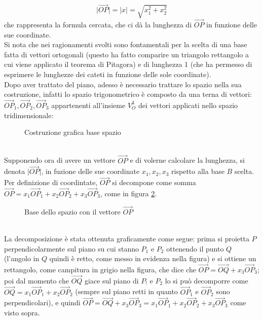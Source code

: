 \documentclass{book}
\newcommand{\abs}[1]{\lvert#1\rvert}
\theoremstyle{definition}
\theoremstyle{plain}
\begin{document}
\begin{equation}
  \label{eq:teoremadiPitapplicatoaAbsOP}
  \abs{\vec{OP}}=\abs{x}=\sqrt{x_1^2+x_2^2}
\end{equation}
che rappresenta la formula cercata, che ci dà la lunghezza di $\vec{OP}$ in funzione delle sue coordinate.\\
Si nota che nei ragionamenti svolti sono fontamentali per la scelta di una base fatta di vettori ortogonali (questo ha fatto comparire un triangolo rettangolo a cui viene applicato il teorema di Pitagora) e di lunghezza 1 (che ha permesso di esprimere le lunghezze dei cateti in funzione delle sole coordinate). \\
Dopo aver trattato del piano, adesso è necessario trattare lo spazio nella sua costruzione, infatti lo spazio trigonometrico è composto da una terna di vettori: $\vec{OP}_1,\vec{OP}_2,\vec{OP}_3$ appartenenti all'insieme $V_O^3$ dei vettori applicati nello spazio tridimensionale:
\begin{figure}[ht!]
  \centering
    \resizebox{4cm}{!}{
      
    }
  \caption{Costruzione grafica base spazio}
  \label{fig:costbasespazio}
\end{figure}\\
Supponendo ora di avere un vettore $\vec{OP}$ e di volerne calcolare la lunghezza, si denota $\abs{\vec{OP}}$, in fuzione delle sue coordinate $x_1,x_2,x_3$ rispetto alla base $B$ scelta. Per definizione di coordintate, $\vec{OP}$ si decompone come somma $\vec{OP}=x_1\vec{OP}_1+x_2\vec{OP}_2+x_3\vec{OP}_3$, come in figura \ref{fig:basedelspazioConVettOP}.
\begin{figure}[ht!]
  \centering
  \resizebox{4cm}{!}{
      
    }
  \caption{Base dello spazio con il vettore $\vec{OP}$}
  \label{fig:basedelspazioConVettOP}
\end{figure}\\
La decomposizione è stata ottenuta graficamente come segue: prima si proietta $P$ perpendicolarmente sul piano su cui stanno $P_1$ e $P_2$ ottenendo il punto $Q$ (l'angolo in $Q$ quindi è retto, come messo in evidenza nella figura) e si ottiene un rettangolo, come campitura in grigio nella figura, che dice che $\vec{OP}=\vec{OQ}+x_3\vec{OP}_3$; poi dal momento che $\vec{OQ}$ giace sul piano di $P_!$ e $P_2$ lo si può decomporre come $\vec{OQ}=x_1\vec{OP}_1+x_2\vec{OP}_2$ (sempre sul piano retti in quanto $\vec{OP}_1$ e $\vec{OP}_2$ sono perpendicolari), e quindi $\vec{OP}=\vec{OQ}+x_3\vec{OP}_3=x_1\vec{OP}_1+x_2\vec{OP}_2+x_3\vec{OP}_3$ come visto sopra.
\end{document}
